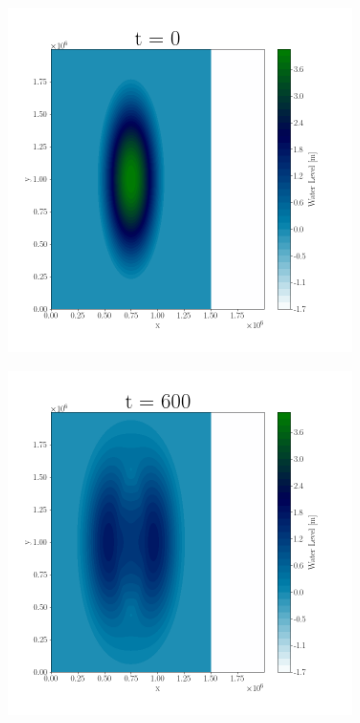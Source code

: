 
\begin{figure}[H]
\centering
\begin{subfigure}[b]{.4\linewidth}
\includegraphics[width=\linewidth]{Figures/5-1.png}
\caption{}
\end{subfigure}
\begin{subfigure}[b]{.4\linewidth}
\includegraphics[width=\linewidth]{Figures/5-2.png}
\caption{}
\end{subfigure}


\end{figure}
